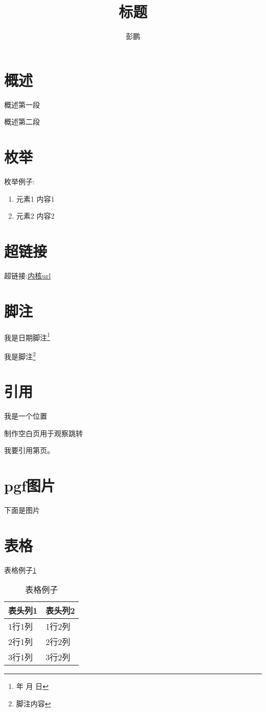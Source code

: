 \documentclass[12pt,a4paper]{article}
\title{标题}
\author{彭鹏}
\renewcommand{\today}{\number\year 年 \number\month 月 \number\day 日}
\begin{document}
\maketitle
\tableofcontents
\newpage

\section{概述}
概述第一段

概述第二段
\section{枚举} 
枚举例子:

\begin{enumerate}
    \item 元素1
        内容1
    \item 元素2
        内容2
\end{enumerate}

\section{超链接} 
超链接:\href{http://ftp.kernel.org/pub/linux/kernel/v3.x/}{内核url}

\section{脚注} 
我是日期脚注\footnote{\today}

我是脚注\footnote{脚注内容}

\section{引用} 
我是一个位置\label{标签1}

制作空白页用于观察跳转
\newpage

我要引用第\pageref{标签1}页。

\section{pgf图片} 
下面是图片

\section{表格} 
表格例子\ref{表格例子}
\begin{table}[!hbp]
\begin{center}
    \begin{tabular}{|l|l|}
        \hline
        表头列1 & 表头列2 \\
        \hline
        1行1列 & 1行2列 \\
        \hline
        2行1列 & 2行2列 \\
        \hline
        3行1列 & 3行2列 \\
        \hline
    \end{tabular}
    \caption{表格例子\label{表格例子}}
\end{center}
\end{table}
\end{document}
